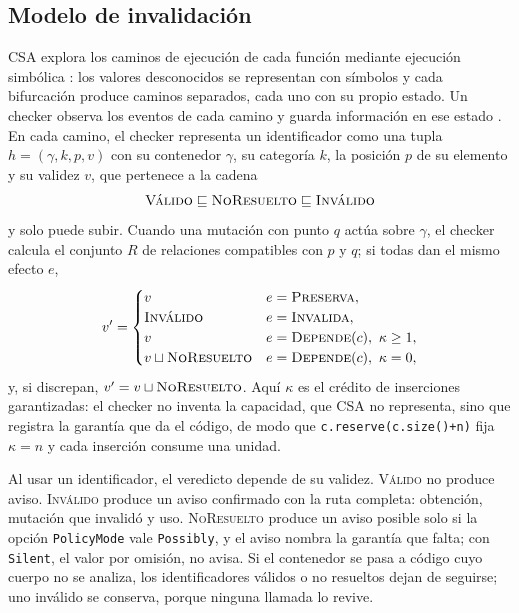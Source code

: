 \documentclass[conference]{IEEEtran}
\newcommand{\code}[1]{\texttt{#1}}
\begin{document}
\subsection{Modelo de invalidación}
CSA explora los caminos de ejecución de cada función mediante ejecución simbólica \cite{king76}: los valores desconocidos se representan con símbolos y cada bifurcación produce caminos separados, cada uno con su propio estado. Un checker observa los eventos de cada camino y guarda información en ese estado \cite{csadev}. En cada camino, el checker representa un identificador como una tupla $h=(\gamma,k,p,v)$ con su contenedor $\gamma$, su categoría $k$, la posición $p$ de su elemento y su validez $v$, que pertenece a la cadena
\begin{equation}
\textsc{Válido} \sqsubseteq \textsc{NoResuelto} \sqsubseteq \textsc{Inválido}
\label{eq:cadena}
\end{equation}
y solo puede subir. Cuando una mutación con punto $q$ actúa sobre $\gamma$, el checker calcula el conjunto $R$ de relaciones compatibles con $p$ y $q$; si todas dan el mismo efecto $e$,
\begin{equation}
v' =
\begin{cases}
v & e=\textsc{Preserva},\\
\textsc{Inválido} & e=\textsc{Invalida},\\
v & e=\textsc{Depende}(c),\ \kappa \geq 1,\\
v \sqcup \textsc{NoResuelto} & e=\textsc{Depende}(c),\ \kappa = 0,
\end{cases}
\label{eq:aplicar}
\end{equation}
y, si discrepan, $v'=v \sqcup \textsc{NoResuelto}$. Aquí $\kappa$ es el crédito de inserciones garantizadas: el checker no inventa la capacidad, que CSA no representa, sino que registra la garantía que da el código, de modo que \code{c.reserve(c.size()+n)} fija $\kappa=n$ y cada inserción consume una unidad.

Al usar un identificador, el veredicto depende de su validez. \textsc{Válido} no produce aviso. \textsc{Inválido} produce un aviso confirmado con la ruta completa: obtención, mutación que invalidó y uso. \textsc{NoResuelto} produce un aviso posible solo si la opción \code{PolicyMode} vale \code{Possibly}, y el aviso nombra la garantía que falta; con \code{Silent}, el valor por omisión, no avisa. Si el contenedor se pasa a código cuyo cuerpo no se analiza, los identificadores válidos o no resueltos dejan de seguirse; uno inválido se conserva, porque ninguna llamada lo revive.
\end{document}
